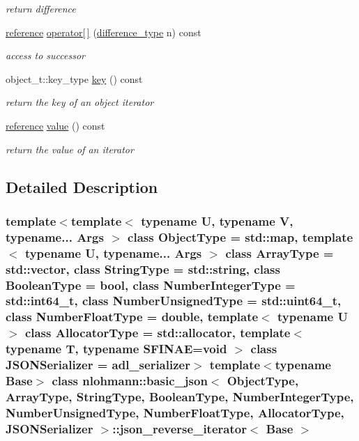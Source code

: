 \begin{DoxyCompactItemize}
\begin{DoxyCompactList}\small\item\em return difference \end{DoxyCompactList}\item 
\mbox{\hyperlink{classnlohmann_1_1basic__json_1_1json__reverse__iterator_ab0021ef2007fd338615360af404dcd4e}{reference}} \mbox{\hyperlink{classnlohmann_1_1basic__json_1_1json__reverse__iterator_af4879af64a0f24bd308b13b859808f84}{operator\mbox{[}$\,$\mbox{]}}} (\mbox{\hyperlink{classnlohmann_1_1basic__json_afe7c1303357e19cea9527af4e9a31d8f}{difference\+\_\+type}} n) const
\begin{DoxyCompactList}\small\item\em access to successor \end{DoxyCompactList}\item 
object\+\_\+t\+::key\+\_\+type \mbox{\hyperlink{classnlohmann_1_1basic__json_1_1json__reverse__iterator_a26c551e1cee90ee52be00b5165804598}{key}} () const
\begin{DoxyCompactList}\small\item\em return the key of an object iterator \end{DoxyCompactList}\item 
\mbox{\hyperlink{classnlohmann_1_1basic__json_1_1json__reverse__iterator_ab0021ef2007fd338615360af404dcd4e}{reference}} \mbox{\hyperlink{classnlohmann_1_1basic__json_1_1json__reverse__iterator_af51506d91ecf911c97521e10a047c841}{value}} () const
\begin{DoxyCompactList}\small\item\em return the value of an iterator \end{DoxyCompactList}\end{DoxyCompactItemize}


\subsection{Detailed Description}
\subsubsection*{template$<$template$<$ typename U, typename V, typename... Args $>$ class Object\+Type = std\+::map, template$<$ typename U, typename... Args $>$ class Array\+Type = std\+::vector, class String\+Type = std\+::string, class Boolean\+Type = bool, class Number\+Integer\+Type = std\+::int64\+\_\+t, class Number\+Unsigned\+Type = std\+::uint64\+\_\+t, class Number\+Float\+Type = double, template$<$ typename U $>$ class Allocator\+Type = std\+::allocator, template$<$ typename T, typename S\+F\+I\+N\+A\+E=void $>$ class J\+S\+O\+N\+Serializer = adl\+\_\+serializer$>$\newline
template$<$typename Base$>$\newline
class nlohmann\+::basic\+\_\+json$<$ Object\+Type, Array\+Type, String\+Type, Boolean\+Type, Number\+Integer\+Type, Number\+Unsigned\+Type, Number\+Float\+Type, Allocator\+Type, J\+S\+O\+N\+Serializer $>$\+::json\+\_\+reverse\+\_\+iterator$<$ Base $>$}


